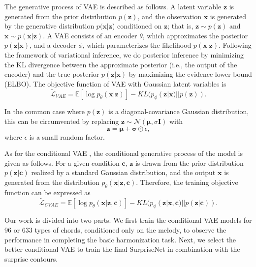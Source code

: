 \documentclass{article}
\begin{document}
The generative process of VAE is described as follows. A latent variable $\mathbf{z}$ is generated from the prior distribution $p(\mathbf{z})$, and the observation $\mathbf{x}$ is generated by the generative distribution $p(\mathbf{x}|\mathbf{z}$) conditioned on $\mathbf{z}$; that is, $\mathbf{z} \sim p(\mathbf{z})$ and $\mathbf{x} \sim p(\mathbf{x}|\mathbf{z})$. A VAE consists of an encoder $\theta$, which approximates the posterior $p(\mathbf{z}|\mathbf{x})$, and a decoder $\phi$, which parameterizes the likelihood $p(\mathbf{x}|\mathbf{z})$. Following the framework of variational inference, we do posterior inference by minimizing the KL divergence between the approximate posterior (i.e., the output of the encoder) and the true posterior $p(\mathbf{z}|\mathbf{x})$ by maximizing the evidence lower bound (ELBO). The objective function of VAE with Gaussian latent variables is
\begin{equation}
\tilde{\mathcal{L}}_{VAE} = \mathbb{E}[\log p_{\theta}(\mathbf{x}|\mathbf{z})] -KL(p_\phi(\mathbf{z}|\mathbf{x})||p(\mathbf{z})).
\end{equation}

In the common case where $p(\mathbf{z})$ is a diagonal-covariance Gaussian distribution, this can be circumvented by replacing $\mathbf{z} \sim \mathcal{N}(\bm{\mu}, \sigma\mathbf{I})$ with 
\begin{equation}
\mathbf{z} = \bm{\mu} + \bm{\sigma} \odot \epsilon,
\end{equation}
where $\epsilon$ is a small random factor.

As for the conditional VAE \cite{Sohn2015}, the conditional generative process of the model is given as follows. For a given condition $\mathbf{c}$, $\mathbf{z}$ is drawn from the prior distribution $p(\mathbf{z}|\mathbf{c})$ realized by a standard Gaussian distribution, and the output $\mathbf{x}$ is generated from the distribution $p_\theta(\mathbf{x}|\mathbf{z},\mathbf{c})$. Therefore, the training objective function can be expressed as
\begin{equation}
\tilde{\mathcal{L}}_{CVAE} = \mathbb{E}[\log p_{\theta}(\mathbf{x}|\mathbf{z},\mathbf{c})] -KL(p_\phi(\mathbf{z}|\mathbf{x},\mathbf{c})||p(\mathbf{z}|\mathbf{c})).
\end{equation}

Our work is divided into two parts. We first train the conditional VAE models for 96 or 633 types of chords, conditioned only on the melody, to observe the performance in completing the basic harmonization task. Next, we select the better conditional VAE to train the final SurpriseNet in combination with the surprise contours.
\end{document}
